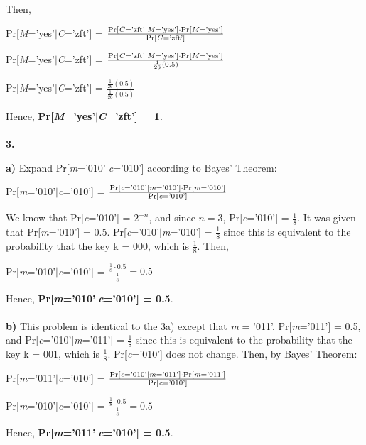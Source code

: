 \documentclass[12pt]{article}
\begin{document}
\noindent Then, 
\begin{center}
Pr[\emph{M}='yes'$|$\emph{C}='zft'] = $\frac{\text{Pr[\emph{C}='zft'}|\text{\emph{M}='yes']} \cdot \text{Pr[\emph{M}='yes']}}{\text{Pr[\emph{C}='zft']}}$

Pr[\emph{M}='yes'$|$\emph{C}='zft'] = $\frac{\text{Pr[\emph{C}='zft'}|\text{\emph{M}='yes']} \cdot \text{Pr[\emph{M}='yes']}}{\frac{1}{26}(0.5)}$

Pr[\emph{M}='yes'$|$\emph{C}='zft'] = $\frac{\frac{1}{26}(0.5)}{\frac{1}{26}(0.5)}$
\end{center}
Hence, \textbf{Pr[\emph{M}='yes'$|$\emph{C}='zft'] = 1}.
\\
\\
\noindent \textbf{3.} 

\noindent \textbf{a)} Expand Pr[\emph{m}='010'$|$\emph{c}='010'] according to Bayes' Theorem:
\begin{center}
Pr[\emph{m}='010'$|$\emph{c}='010'] = $\frac{\text{Pr[\emph{c}='010'}|\text{\emph{m}='010']} \cdot \text{Pr[\emph{m}='010']}}{\text{Pr[\emph{c}='010']}}$
\end{center}
\noindent We know that Pr[\emph{c}='010'] = $2^{-n}$, and since $n = 3$, Pr[\emph{c}='010'] = $\frac{1}{8}$. It was given that Pr[\emph{m}='010'] = 0.5. Pr[\emph{c}='010'$|$\emph{m}='010'] = $\frac{1}{8}$ since this is equivalent to the probability that the key k = 000, which is $\frac{1}{8}$. Then, 
\begin{center}
Pr[\emph{m}='010'$|$\emph{c}='010'] = $\frac{\frac{1}{8} \cdot 0.5}{\frac{1}{8}} = 0.5$
\end{center}
\noindent Hence, \textbf{Pr[\emph{m}='010'$|$\emph{c}='010'] = 0.5}.
\\
\\
\noindent \textbf{b)} This problem is identical to the 3a) except that \emph{m} = '011'. Pr[\emph{m}='011'] = 0.5, and Pr[\emph{c}='010'$|$\emph{m}='011'] = $\frac{1}{8}$ since this is equivalent to the probability that the key k = 001, which is $\frac{1}{8}$. Pr[\emph{c}='010'] does not change. Then, by Bayes' Theorem: 
\begin{center}
Pr[\emph{m}='011'$|$\emph{c}='010'] = $\frac{\text{Pr[\emph{c}='010'}|\text{\emph{m}='011']} \cdot \text{Pr[\emph{m}='011']}}{\text{Pr[\emph{c}='010']}}$

Pr[\emph{m}='010'$|$\emph{c}='010'] = $\frac{\frac{1}{8} \cdot 0.5}{\frac{1}{8}} = 0.5$
\end{center}
\noindent Hence, \textbf{Pr[\emph{m}='011'$|$\emph{c}='010'] = 0.5}.
\\
\end{document}
